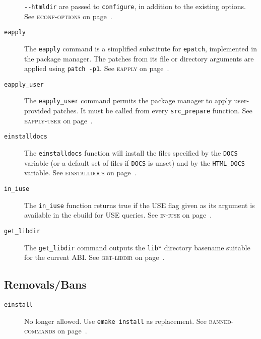 \documentclass[a4paper,nofoldmark]{leaflet}
\newcommand{\code}[1]{\texttt{#1}}
\newcommand{\featureref}[1]{\textsc{#1} on page~\pageref{feat:#1}}
\begin{document}
\begin{description}
    \code{-{}-htmldir} are passed to \code{configure}, in addition to
    the existing options.
    See \featureref{econf-options}.
    \item[\code{eapply}] The \code{eapply} command is a simplified
    substitute for \code{epatch}, implemented in the package manager.
    The patches from its file or directory arguments are applied using
    \code{patch -p1}.
    See \featureref{eapply}.
    \item[\code{eapply_user}] The \code{eapply_user} command permits
    the package manager to apply user-provided patches. It must be
    called from every \code{src_prepare} function.
    See \featureref{eapply-user}.
    \item[\code{einstalldocs}] The \code{einstalldocs} function will
    install the files specified by the \code{DOCS} variable (or a
    default set of files if \code{DOCS} is unset) and by the
    \code{HTML_DOCS} variable.
    See \featureref{einstalldocs}.
    \item[\code{in_iuse}] The \code{in_iuse} function returns
    true if the USE flag given as its argument is available in the
    ebuild for USE queries.
    See \featureref{in-iuse}.
    \item[\code{get_libdir}] The \code{get_libdir} command outputs
    the \code{lib*} directory basename suitable for the current ABI\@.
    See \featureref{get-libdir}.
\end{description}
\subsection{Removals/Bans}
\label{sec:cs:eapi6-removalsbans}
\begin{description}
    \item[\code{einstall}] No longer allowed. Use \code{emake install}
    as replacement.
    See \featureref{banned-commands}.
\end{description}
\end{document}
